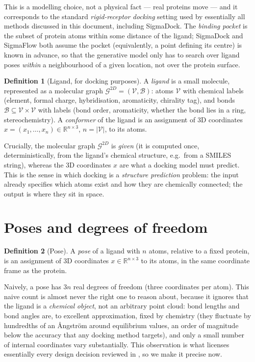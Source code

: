 \documentclass[11pt,a4paper]{report}
\theoremstyle{definition}
\newtheorem{definition}[definition]{Definition}
\theoremstyle{remark}
\newcommand{\RR}{\mathbb R}
\begin{document}
This is a modelling choice, not a physical fact --- real proteins move --- and
it corresponds to the standard \emph{rigid-receptor docking} setting used by
essentially all methods discussed in this document, including SigmaDock. The
\emph{binding pocket} is the subset of protein atoms within some distance of
the ligand; SigmaDock and SigmaFlow both assume the pocket (equivalently, a
point defining its centre) is known in advance, so that the generative model
only has to search over ligand poses \emph{within} a neighbourhood of a given
location, not over the protein surface.

\begin{definition}[Ligand, for docking purposes]
\label{def:ligand}
A \emph{ligand} is a small molecule, represented as a molecular graph
$\mathcal G^{2D} = (\mathcal V, \mathcal B)$: atoms $\mathcal V$ with chemical
labels (element, formal charge, hybridisation, aromaticity, chirality tag),
and bonds $\mathcal B \subseteq \mathcal V \times \mathcal V$ with labels
(bond order, aromaticity, whether the bond lies in a ring, stereochemistry).
A \emph{conformer} of the ligand is an assignment of 3D coordinates
$x = (x_1,\dots,x_n) \in \RR^{n\times3}$, $n=|\mathcal V|$, to its atoms.
\end{definition}

Crucially, the molecular graph $\mathcal G^{2D}$ is \emph{given} (it is
computed once, deterministically, from the ligand's chemical structure,
e.g.\ from a SMILES string), whereas the 3D coordinates $x$ are what a
docking model must predict. This is the sense in which docking is a
\emph{structure prediction} problem: the input already specifies which atoms
exist and how they are chemically connected; the output is where they sit in
space.

\section{Poses and degrees of freedom}
\label{sec:pose-dof}

\begin{definition}[Pose]
\label{def:pose}
A \emph{pose} of a ligand with $n$ atoms, relative to a fixed protein, is an
assignment of 3D coordinates $x \in \RR^{n \times 3}$ to its atoms, in the
same coordinate frame as the protein.
\end{definition}

Naively, a pose has $3n$ real degrees of freedom (three coordinates per
atom). This naive count is almost never the right one to reason about,
because it ignores that the ligand is a \emph{chemical object}, not an
arbitrary point cloud: bond lengths and bond angles are, to excellent
approximation, fixed by chemistry (they fluctuate by hundredths of an
\r{A}ngstr\"om around equilibrium values, an order of magnitude below the
accuracy that any docking method targets), and only a small number of
internal coordinates vary substantially. This observation is what licenses
essentially every design decision reviewed in , so we
make it precise now.
\end{document}
